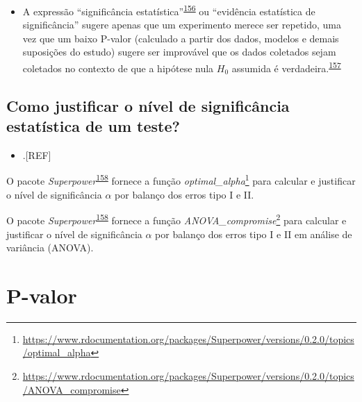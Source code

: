 \documentclass[
  a4paper,
]{book}
\providecommand{\tightlist}{%
  \setlength{\itemsep}{0pt}\setlength{\parskip}{0pt}}
\renewcommand{\href}[2]{#2\footnote{\url{#1}}}
\newenvironment{infobox}[1]
  {
  \begin{itemize}
  \renewcommand{\labelitemi}{
    \raisebox{-.7\height}[0pt][0pt]{
      {\setkeys{Gin}{width=3em,keepaspectratio}
        \texttt{[image: \#1]}}
    }
  }
  \setlength{\fboxsep}{1em}
  \begin{blackbox}
  \item
  }
  {
  \end{blackbox}
  \end{itemize}
  }
\begin{document}
\begin{itemize}
\tightlist
\item
  A expressão ``significância estatística''\textsuperscript{\protect\hyperlink{ref-latter1902}{156}} ou ``evidência estatística de significância'' sugere apenas que um experimento merece ser repetido, uma vez que um baixo P-valor (calculado a partir dos dados, modelos e demais suposições do estudo) sugere ser improvável que os dados coletados sejam coletados no contexto de que a hipótese nula \(H_{0}\) assumida é verdadeira.\textsuperscript{\protect\hyperlink{ref-aylmerfisher1926}{157}}
\end{itemize}

\hypertarget{como-justificar-o-nuxedvel-de-significuxe2ncia-estatuxedstica-de-um-teste}{%
\subsection{Como justificar o nível de significância estatística de um teste?}\label{como-justificar-o-nuxedvel-de-significuxe2ncia-estatuxedstica-de-um-teste}}

\begin{itemize}
\tightlist
\item
  .{[}REF{]}
\end{itemize}

\begin{infobox}{images/Rlogo}
O pacote \emph{Superpower}\textsuperscript{\protect\hyperlink{ref-Superpower}{158}} fornece a função \href{https://www.rdocumentation.org/packages/Superpower/versions/0.2.0/topics/optimal_alpha}{\emph{optimal\_alpha}} para calcular e justificar o nível de significância \(\alpha\) por balanço dos erros tipo I e II.

\end{infobox}

\begin{infobox}{images/Rlogo}
O pacote \emph{Superpower}\textsuperscript{\protect\hyperlink{ref-Superpower}{158}} fornece a função \href{https://www.rdocumentation.org/packages/Superpower/versions/0.2.0/topics/ANOVA_compromise}{\emph{ANOVA\_compromise}} para calcular e justificar o nível de significância \(\alpha\) por balanço dos erros tipo I e II em análise de variância (ANOVA).

\end{infobox}

\hypertarget{p-valor}{%
\section{P-valor}\label{p-valor}}
\end{document}
